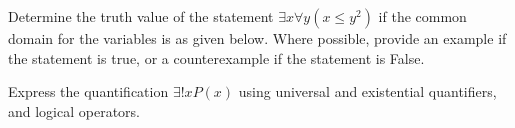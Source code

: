 \documentclass[a4paper]{exam}
\begin{document}
\begin{questions}

  \question Determine the truth value of the statement $\exists x \forall y (x \le y^2)$ if the common domain for the variables is as given below. Where possible, provide an example if the statement is true, or a counterexample if the statement is False.
  
  \question Express the quantification $\exists!x P(x)$ using universal and existential quantifiers, and logical operators.
    \begin{solution}
    \end{solution}
  
\end{questions}
\end{document}
